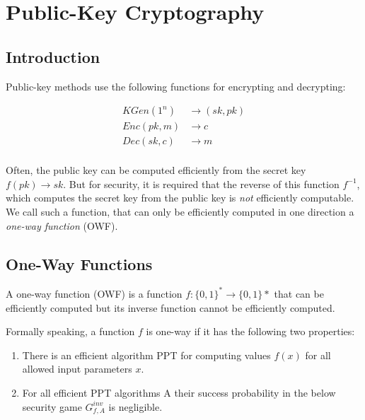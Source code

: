 \chapter{Public-Key Cryptography}\label{ch:pub_key_crypto}

\section{Introduction}\label{sec:pubkey:intro}

Public-key methods use the following functions for encrypting and decrypting:

\begin{align*}
    KGen(1^n)  & \rightarrow (sk, pk) \\
    Enc(pk, m) & \rightarrow c        \\
    Dec(sk, c) & \rightarrow m        \\
\end{align*}

Often, the public key can be computed efficiently from the secret key $f(pk) \rightarrow sk$.
But for security, it is required that the reverse of this function $f^{-1}$, which computes the secret key from the public key is \emph{not} efficiently computable.
We call such a function, that can only be efficiently computed in one direction a \emph{one-way function} (OWF).

\section{One-Way Functions}\label{sec:owf}

A one-way function (OWF) is a function $f: \{0,1\}^* \rightarrow \{0,1\}*$ that can be efficiently computed but its inverse function cannot be efficiently computed.

Formally speaking, a function $f$ is one-way if it has the following two properties:

\begin{enumerate}
    \item There is an efficient algorithm PPT for computing values $f(x)$ for all allowed input parameters $x$.
    \item For all efficient PPT algorithms A their success probability in the below security game $G^{inv}_{f,A}$ is negligible.
\end{enumerate}


